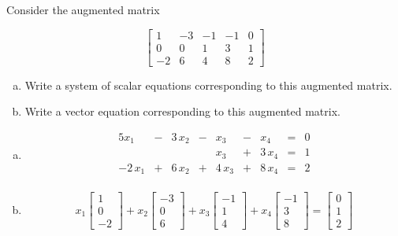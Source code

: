 
\begin{exerciseStatement}


 Consider the augmented matrix 

\[ \left[\begin{array}{cccc|c}
1 & -3 & -1 & -1 & 0 \\
0 & 0 & 1 & 3 & 1 \\
-2 & 6 & 4 & 8 & 2
\end{array}\right] \]
\begin{enumerate}[(a)]
\item  Write a system of scalar equations corresponding to this augmented matrix. 
\item  Write a vector equation corresponding to this augmented matrix. 
\end{enumerate}
    
\end{exerciseStatement}
    
\begin{exerciseAnswer} 

\begin{enumerate}[(a)]
\item 
\begin{alignat*}{5} x_{1} &-& 3 \, x_{2} &-& x_{3} &-& x_{4} &=& 0 \\ & &  & & x_{3} &+& 3 \, x_{4} &=& 1 \\-2 \, x_{1} &+& 6 \, x_{2} &+& 4 \, x_{3} &+& 8 \, x_{4} &=& 2 \\ \end{alignat*}
            
\item \[ x_{1} \left[\begin{array}{c}
1 \\
0 \\
-2
\end{array}\right] + x_{2} \left[\begin{array}{c}
-3 \\
0 \\
6
\end{array}\right] + x_{3} \left[\begin{array}{c}
-1 \\
1 \\
4
\end{array}\right] + x_{4} \left[\begin{array}{c}
-1 \\
3 \\
8
\end{array}\right] = \left[\begin{array}{c}
0 \\
1 \\
2
\end{array}\right] \]
\end{enumerate}
    
\end{exerciseAnswer}
    
